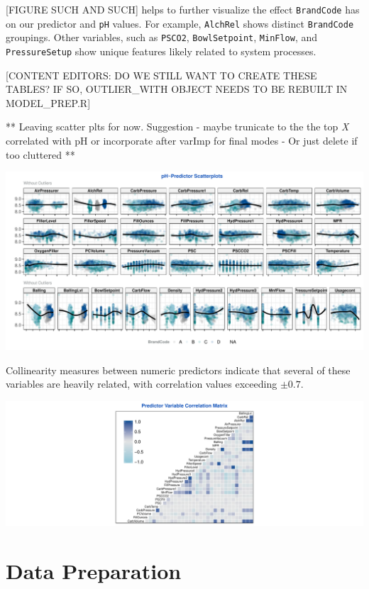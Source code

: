 \documentclass[]{report}
\begin{document}
{[}FIGURE SUCH AND SUCH{]} helps to further visualize the effect
\texttt{BrandCode} has on our predictor and \texttt{pH} values. For
example, \texttt{AlchRel} shows distinct \texttt{BrandCode} groupings.
Other variables, such as \texttt{PSCO2}, \texttt{BowlSetpoint},
\texttt{MinFlow}, and \texttt{PressureSetup} show unique features likely
related to system processes.

{[}CONTENT EDITORS: DO WE STILL WANT TO CREATE THESE TABLES? IF SO,
OUTLIER\_WITH OBJECT NEEDS TO BE REBUILT IN MODEL\_PREP.R{]}

** Leaving scatter plts for now. Suggestion - maybe trunicate to the the
top \emph{X} correlated with pH or incorporate after varImp for final
modes - Or just delete if too cluttered **

\includegraphics{Group2_Project2_Fall2019_files/figure-latex/unnamed-chunk-5-1.pdf}

Collinearity measures between numeric predictors indicate that several
of these variables are heavily related, with correlation values
exceeding \(\pm{0.7}\).

\includegraphics{Group2_Project2_Fall2019_files/figure-latex/unnamed-chunk-6-1.pdf}

\hypertarget{data-preparation}{%
\chapter{Data Preparation}\label{data-preparation}}
\end{document}

